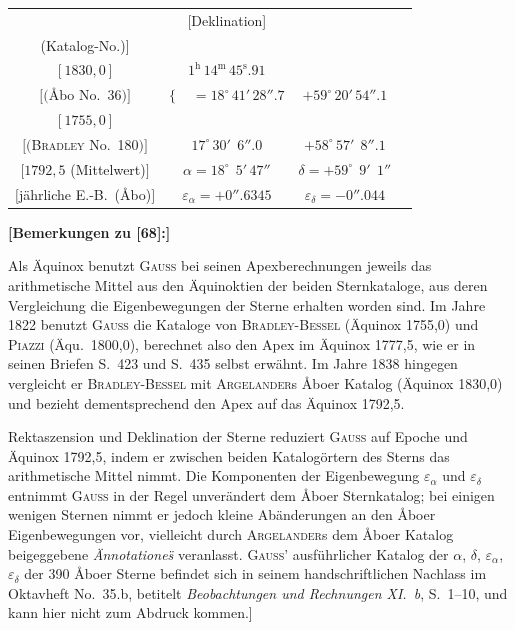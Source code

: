 \documentclass[12pt,a4paper]{article}
\theoremstyle{plain}
\theoremstyle{definition}
\theoremstyle{remark}
\begin{document}
\begin{small}
\begin{center}
\begin{tabular}{|c|c|c|c|}
\hline
[Epoch und \"Aquinox & [Rektaszension] & [Deklination] \\
(Katalog-No.)] & & \\
\hline
$[1830,0]$ & $1^{\mathrm{h}}\,14^{\mathrm{m}}\,45^{\mathrm{s}}\!.91$ & \\
$[($\AA bo No.~36$)]$ & $\big\{\begin{array}{l}\\\end{array}$ $= 18^{\circ}\,41'\,28''\!\!.7$ & $+59^{\circ}\,20'\,54''\!\!.1$ \\
\hline
$[1755,0]$ & & \\
$[($\textsc{Bradley} No.~180$)]$ & $17^{\circ}\,30'\;\,6''\!\!.0$ & $+58^{\circ}\,57'\;\,8''\!\!.1$ \\
\hline
$[1792,5$ (Mittelwert)$]$ & $\alpha = 18^{\circ}\;\,5'\,47''$ & $\delta = +59^{\circ}\;\,9'\;\,1''$ \\
$[$j\"ahrliche E.-B.~(\AA bo)$]$ & $\varepsilon_{\alpha} = +0''\!\!.6345$ & $\varepsilon_{\delta} = -0''\!\!.044$ \\
\hline
\end{tabular}
\end{center}
\end{small}

\medskip
\noindent\textbf{[Bemerkungen zu [68]:]}
\begin{small}

Als \"Aquinox benutzt \textsc{Gau\ss} bei seinen Apexberechnungen jeweils das
arithmetische Mittel aus den \"Aquinoktien der beiden Sternkataloge, aus deren
Vergleichung die Eigenbewegungen der Sterne erhalten worden sind. Im Jahre 1822
benutzt \textsc{Gau\ss} die Kataloge von \textsc{Bradley-Bessel} (\"Aquinox 1755,0) und
\textsc{Piazzi} (\"Aqu.~1800,0), berechnet also den Apex im \"Aquinox 1777,5, wie er
in seinen Briefen S.~423 und S.~435 selbst erw\"ahnt. Im Jahre 1838 hingegen
vergleicht er \textsc{Bradley-Bessel} mit \textsc{Argelander}s \AA boer Katalog
(\"Aquinox 1830,0) und bezieht dementsprechend den Apex auf das \"Aquinox 1792,5.

Rektaszension und Deklination der Sterne reduziert \textsc{Gau\ss} auf Epoche und
\"Aquinox 1792,5, indem er zwischen beiden Katalog\"ortern des Sterns das
arithmetische Mittel nimmt. Die Komponenten der Eigenbewegung $\varepsilon_{\alpha}$ und
$\varepsilon_{\delta}$ entnimmt \textsc{Gau\ss} in der Regel unver\"andert dem \AA boer Sternkatalog;
bei einigen wenigen Sternen nimmt er jedoch kleine Ab\"anderungen an den \AA boer
Eigenbewegungen vor, vielleicht durch \textsc{Argelander}s dem \AA boer Katalog
beigeggebene \textit{\"Annotationes\"} veranlasst. \textsc{Gau\ss'} ausf\"uhrlicher Katalog
der $\alpha$, $\delta$, $\varepsilon_{\alpha}$, $\varepsilon_{\delta}$ der 390 \AA boer Sterne befindet sich in seinem
handschriftlichen Nachlass im Oktavheft No.~35.b, betitelt \textit{\glqq Beobachtungen und
Rechnungen XI.~b\grqq}, S.~1--10, und kann hier nicht zum Abdruck kommen.]
\end{small}
\end{document}
